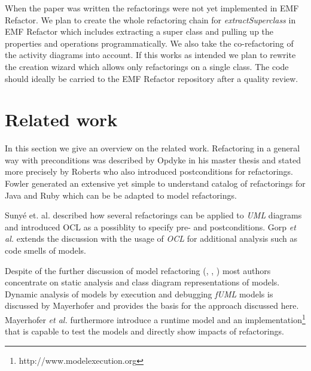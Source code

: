 \documentclass{llncs}
\begin{document}
When the paper was written the refactorings were not yet implemented in EMF Refactor.
We plan to create the whole refactoring chain for \textit{extractSuperclass} in EMF Refactor which includes extracting 
a super class and pulling up the properties and operations programmatically. We also take the co-refactoring of the activity 
diagrams into account. If this works as intended we plan to rewrite the creation wizard which allows only refactorings 
on a single class. The code should ideally be carried to the EMF Refactor repository after a quality review.

\section{Related work}
\label{sec:relatedwork}

In this section we give an overview on the related work. Refactoring in a general way with preconditions was described
by Opdyke \cite{mast:REFOOF} in his master thesis and stated more precisely by Roberts \cite{rob99} who also introduced
postconditions for refactorings. Fowler \cite{fow99} generated an extensive yet simple to understand catalog of
refactorings for Java and Ruby which can be be adapted to model refactorings.


Suny{\'e} et. al. \cite{DBLP:conf/uml/SunyePTJ01} described how several refactorings can be applied to \textit{UML}
diagrams and introduced OCL as a possiblity to specify pre- and postconditions. Gorp \textit{et al.} \cite{gorp03} extends the
discussion with the usage of \textit{OCL} for additional analysis such as code smells of models.


Despite of the further discussion of model refactoring (\cite{DBLP:conf/uml/CorreaW04}, \cite{DBLP:conf/ershov/BaarM06},
\cite{DBLP:journals/ase/ArendtT13}) most authors concentrate on static analysis and class diagram representations of
models. Dynamic analysis of models by execution and debugging \textit{fUML} models is discussed by Mayerhofer
\cite{DBLP:conf/icse/Mayerhofer12} and provides the basis for the approach discussed here. Mayerhofer \textit{et al.}
\cite{DBLP:conf/models/MayerhoferLK12} furthermore introduce a runtime model and an
implementation\footnote{http://www.modelexecution.org} that is capable to test the models and directly show impacts of
refactorings.
\end{document}
